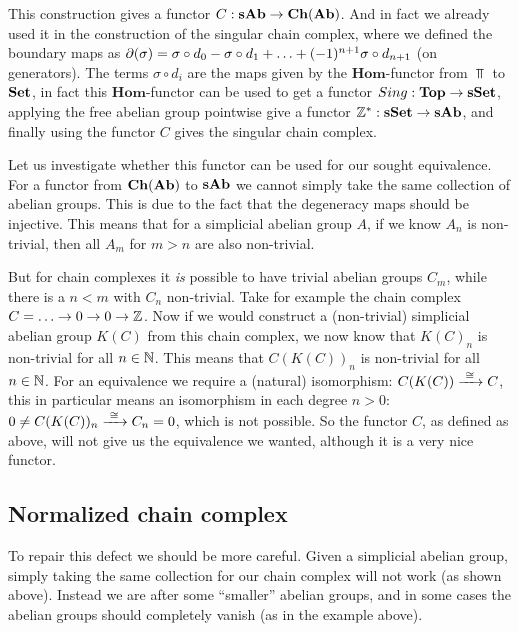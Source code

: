 This construction gives a functor $C : \mathbf{sAb} \to \mathbf{Ch}(\mathbf{Ab})$. And in fact we already used it in the construction of the singular chain complex, where we defined the boundary maps as $\partial(\sigma) = \sigma \circ d_0 - \sigma \circ d_1 + \ldots + (-1)^{n+1} \sigma \circ d_{n+1}$ (on generators). The terms $\sigma \circ d_i$ are the maps given by the $\mathbf{Hom}$-functor from $\Top$ to $\mathbf{Set}$, in fact this $\mathbf{Hom}$-functor can be used to get a functor $Sing : \mathbf{Top} \to \mathbf{sSet}$, applying the free abelian group pointwise give a functor $\mathbb{Z}^\ast : \mathbf{sSet} \to \mathbf{sAb}$, and finally using the functor $C$ gives the singular chain complex.

Let us investigate whether this functor can be used for our sought equivalence. For a functor from $\mathbf{Ch}(\mathbf{Ab})$ to $\mathbf{sAb}$ we cannot simply take the same collection of abelian groups. This is due to the fact that the degeneracy maps should be injective. This means that for a simplicial abelian group $A$, if we know $A_n$ is non-trivial, then all $A_m$ for $m > n$ are also non-trivial.

But for chain complexes it \emph{is} possible to have trivial abelian groups $C_m$, while there is a $n < m$ with $C_n$ non-trivial. Take for example the chain complex $ C = \ldots \to 0 \to 0 \to \mathbb{Z} $. Now if we would construct a (non-trivial) simplicial abelian group $K(C)$ from this chain complex, we now know that $K(C)_n$ is non-trivial for all $n \in \mathbb{N}$. This means that $C(K(C))_n$ is non-trivial for all $n \in \mathbb{N}$. For an equivalence we require a (natural) isomorphism: $C(K(C)) \xrightarrow{\,\,{\cong}\,\,} C$, this in particular means an isomorphism in each degree $n > 0$: $ 0 \neq C(K(C))_n \xrightarrow{\,\,{\cong}\,\,} C_n = 0 $, which is not possible. So the functor $C$, as defined as above, will not give us the equivalence we wanted, although it is a very nice functor.

\subsection{Normalized chain complex}
To repair this defect we should be more careful. Given a simplicial abelian group, simply taking the same collection for our chain complex will not work (as shown above). Instead we are after some ``smaller'' abelian groups, and in some cases the abelian groups should completely vanish (as in the example above).

